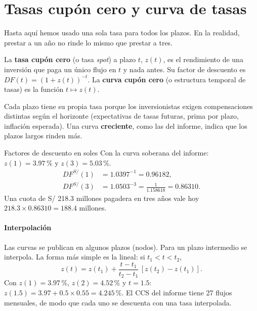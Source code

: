 \section{Tasas cupón cero y curva de tasas}\label{sec:curva}

Hasta aquí hemos usado una sola tasa para todos los plazos. En la realidad, prestar a un año no rinde lo mismo que prestar a tres.

\begin{definicion}
La \textbf{tasa cupón cero} (o tasa \emph{spot}) a plazo $t$, $z(t)$, es el rendimiento de una inversión que paga un único flujo en $t$ y nada antes. Su factor de descuento es $DF(t)=(1+z(t))^{-t}$. La \textbf{curva cupón cero} (o estructura temporal de tasas) es la función $t\mapsto z(t)$.
\end{definicion}

Cada plazo tiene su propia tasa porque los inversionistas exigen compensaciones distintas según el horizonte (expectativas de tasas futuras, prima por plazo, inflación esperada). Una curva \textbf{creciente}, como las del informe, indica que los plazos largos rinden más.


\begin{ejemplo}{Factores de descuento en soles}
Con la curva soberana del informe: $z(1)=3.97\,\%$ y $z(3)=5.03\,\%$.
\begin{align*} DF^{S/}(1)&=1.0397^{-1}=0.96182,\\ DF^{S/}(3)&=1.0503^{-3}=\frac{1}{1.158618}=0.86310. \end{align*}
Una cuota de S/ 218.3 millones pagadera en tres años vale hoy $218.3\times0.86310=188.4$ millones.
\end{ejemplo}

\paragraph{Interpolación} Las curvas se publican en algunos plazos (nodos). Para un plazo intermedio se interpola. La forma más simple es la lineal: si $t_1<t<t_2$,
\[ z(t)=z(t_1)+\frac{t-t_1}{t_2-t_1}\,[z(t_2)-z(t_1)]. \]
Con $z(1)=3.97\,\%$, $z(2)=4.52\,\%$ y $t=1.5$: $z(1.5)=3.97+0.5\times0.55=4.245\,\%$. El CCS del informe tiene 27 flujos mensuales, de modo que cada uno se descuenta con una tasa interpolada.

